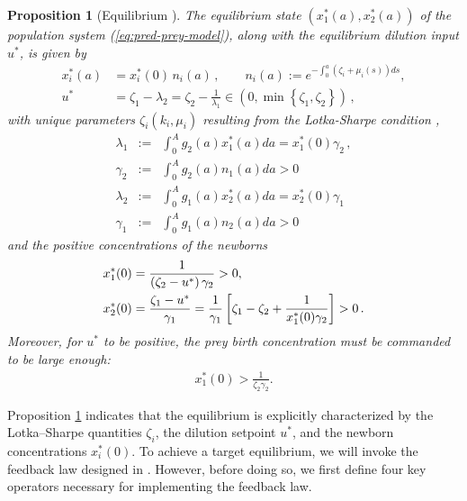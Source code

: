 \documentclass[journal,twoside,web]{ieeecolor}
\newtheorem{proposition}{Proposition}
\begin{document}
\begin{proposition}[Equilibrium \cite{veil2025stabilization}]
\label{prop:steady}
The equilibrium  state $(x_1^*(a),x_2^*(a))$ of the population system (\ref{eq:pred-prey-model}), along with the equilibrium dilution input $u^*$, is given by
\begin{subequations}
\begin{align}
x_i^* (a) &= x_i^*(0)\, n_i(a)\,, \qquad n_i(a):= {e^{-{\int_0^a (\zeta_i + \mu_i(s)) d s}}},\label{eq:ss_profiles}\\
u^* &= \zeta_1 -  \lambda_2 = \zeta_2 - \frac{1}{\lambda_1}  \in \left(0, \min\left\{\zeta_1 , \zeta_2\right\}\right)\,,
\label{eq:u_star_constraint}
\end{align}
\end{subequations}
with unique parameters $\zeta_i(k_i,\mu_i)$ resulting from the Lotka-Sharpe condition \cite{sharpe1911problem}, 
\begin{subequations}
    \label{eq:def_lambda}
\begin{eqnarray}
\lambda_1&:=& \int_0^A g_2(a) x_1^*(a) d a = x_1^*(0)\gamma_2\,,   \\   
\gamma_2 &:=& \int_0^A g_2(a)n_1(a) da >0 \\
\lambda_2&:=& \int_0^A g_1(a) x_2^*(a) d a = x_2^*(0) \gamma_1 \\ 
\gamma_1 &:=& \int_0^A g_1(a)n_2(a) da>0
\end{eqnarray}
\end{subequations}
and the positive  concentrations of the newborns 
\begin{subequations}
    \begin{align}
    x_1^*(0) =&\;  \frac{1}{\left(\zeta_2-u^*\right) %
    \gamma_2} >0, \\
    x_2^*(0) =&\; \frac{\zeta_1-u^*}{
    \gamma_1}  = \frac{1}{\gamma_1} \left[\zeta_1 - \zeta_2
        + \frac{1}{x_1^*(0)\gamma_2} \right]> 0\,. \label{eq-x2star-zero}
    \end{align}
    \label{eq:ic_constraint}
\end{subequations}
Moreover, for $u^*$ to be positive, the prey birth concentration must be commanded to be large enough: 
\begin{align}
    x_1^*(0) > \frac{1}{\zeta_2%
    \gamma_2 }.
\end{align}
\end{proposition}

Proposition \ref{prop:steady} indicates that the equilibrium is explicitly characterized by the Lotka--Sharpe quantities $\zeta_i$, the dilution setpoint $u^\ast$, and the newborn concentrations $x_i^\ast(0)$. To achieve a target equilibrium, we will invoke the feedback law designed in \cite{veil2025stabilization}. However, before doing so, we first define four key operators necessary for implementing the feedback law. 
\end{document}
